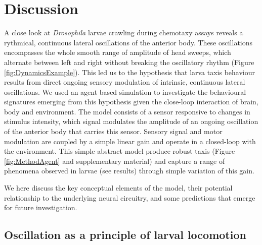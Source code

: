 \documentclass[11pt,a4paper]{article}
\newcommand{\Dros }{\emph{Drosophila }}
\newcommand{\todoBW}[1]{\todo[author=BW,color=orange, size=\tiny,inline]{1}}
\begin{document}
\section{Discussion}
A close look at \Dros larvae crawling during chemotaxy assays reveals a rythmical, continuous lateral oscillations of the anterior body. These oscillations encompasses the whole smooth range of amplitude of head sweeps, which alternate between left and right without breaking the oscillatory rhythm (Figure \ref{fig:DynamicsExample}). This led us to the hypothesis that larva taxis behaviour results from direct ongoing sensory modulation of intrinsic, continuous lateral oscillations. We used an agent based simulation to investigate the behavioural signatures emerging from this hypothesis given the close-loop interaction of brain, body and environment. 
 The model consists of a sensor responsive to changes in stimulus intensity, which signal modulates the amplitude of an ongoing oscillation of the anterior body that carries this sensor. Sensory signal and motor modulation are coupled by a simple linear gain and operate in a closed-loop with the environment. This simple abstract model produce robust taxis (Figure \ref{fig:MethodAgent} and supplementary material) and capture a range of phenomena observed in larvae (see results) through simple variation of this gain.

 We here discuss the key conceptual elements of the model, their potential relationship to the underlying neural circuitry, and some predictions that emerge for future investigation.


\subsection{Oscillation as a principle of larval locomotion}
\end{document}
